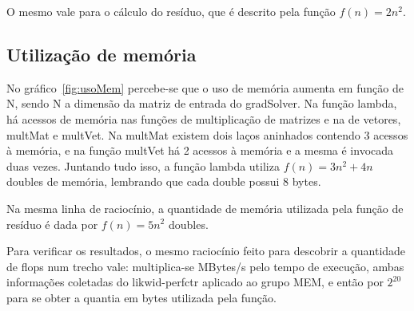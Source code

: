 \documentclass[12pt]{article}
\begin{document}
O mesmo vale para o cálculo do resíduo, que é descrito pela função $f(n) =
2n^2$.

\subsection{Utilização de memória}\label{sec:utilizacaoMemoria}

No gráfico~\ref{fig:usoMem} percebe-se que o uso de memória aumenta em função de
N, sendo N a dimensão da matriz de entrada do gradSolver. Na função lambda, há
acessos de memória nas funções de multiplicação de matrizes e na de vetores,
multMat e multVet. Na multMat existem dois laços aninhados contendo 3 acessos à
memória, e na função multVet há 2 acessos à memória e a mesma é invocada duas
vezes. Juntando tudo isso, a função lambda utiliza $f(n) = 3n^2 + 4n$ doubles de
memória, lembrando que cada double possui 8 bytes.

Na mesma linha de raciocínio, a quantidade de memória utilizada pela função de
resíduo é dada por $f(n) = 5n^2$ doubles.

Para verificar os resultados, o mesmo raciocínio feito para descobrir a
quantidade de flops num trecho vale: multiplica-se MBytes/s pelo tempo de
execução, ambas informações coletadas do likwid-perfctr aplicado ao grupo MEM, e
então por $2^{20}$ para se obter a quantia em bytes utilizada pela função.
\end{document}
